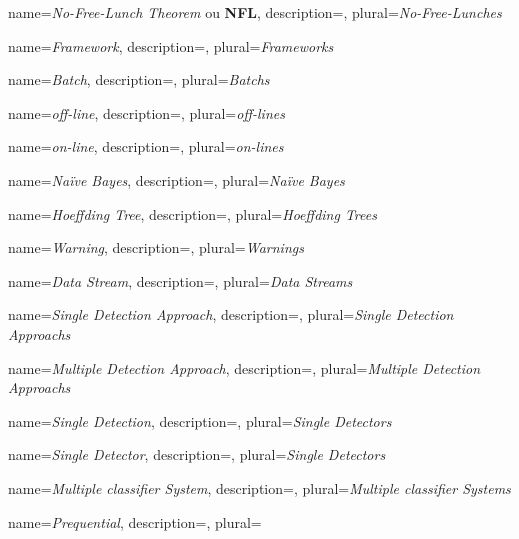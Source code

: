 


\glsdisablehyper

{
  name=\textit{No-Free-Lunch Theorem} ou \textbf{NFL},
  description={},
  plural=\textit{No-Free-Lunches}
}


{
  name=\textit{Framework},
  description={},
  plural=\textit{Frameworks}
}

{
  name=\textit{Batch},
  description={},
  plural=\textit{Batchs}
}


{
  name=\textit{off-line},
  description={},
  plural=\textit{off-lines}
}

{
  name=\textit{on-line},
  description={},
  plural=\textit{on-lines}
}


{
  name=\textit{Na{\"i}ve Bayes},
  description={},
  plural=\textit{Na{\"i}ve Bayes}
}

{
  name=\textit{Hoeffding Tree},
  description={},
  plural=\textit{Hoeffding Trees}
}


{
  name=\textit{Warning},
  description={},
  plural=\textit{Warnings}
}




{
  name=\textit{Data Stream},
  description={},
  plural=\textit{Data Streams}
}


{
  name=\textit{Single Detection Approach},
  description={},
  plural=\textit{Single Detection Approachs}
}



{
  name=\textit{Multiple Detection Approach},
  description={},
  plural=\textit{Multiple Detection Approachs}
}

{
  name=\textit{Single Detection},
  description={},
  plural=\textit{Single Detectors}
}


{
  name=\textit{Single Detector},
  description={},
  plural=\textit{Single Detectors}
}



{
  name=\textit{Multiple classifier System},
  description={},
  plural=\textit{Multiple classifier Systems}
}
 

{
  name=\textit{Prequential},
  description={},
  plural=\textit{}
}


